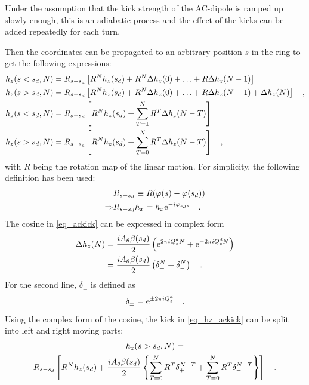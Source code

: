Under the assumption that the kick strength of the AC-dipole is ramped up slowly enough, this is an
adiabatic process and the effect of the kicks can be added repeatedly for each turn.

Then the coordinates can be propagated to an arbitrary position $s$ in the ring to get the following
expressions:
%
\begin{align}
    h_z(s<s_d, N) &= R_{s-s_d}\left[R^N h_z(s_d) + R^N\Delta h_z(0) + \ldots + R\Delta h_z(N-1)\right] \notag\\
    h_z(s>s_d, N) &= R_{s-s_d}\left[R^N h_z(s_d) + R^N\Delta h_z(0) + \ldots + R\Delta h_z(N-1) + \Delta h_z(N)\right] 
    \quad ,\\
    h_z(s<s_d, N) &= R_{s-s_d}\left[R^N h_z(s_d) + \sum\limits_{T=1}^N R^T\Delta h_z(N-T)\right] \notag\\
    h_z(s>s_d, N) &= R_{s-s_d}\left[R^N h_z(s_d) + \sum\limits_{T=0}^N R^T\Delta h_z(N-T)\right]
    \quad ,
    \label{eq_hz_ackick}
\end{align}
%
with $R$ being the rotation map of the linear motion. For simplicity, the following definition has been used:
%
\begin{align}
    &R_{s-s_d} \equiv R(\varphi(s) - \varphi(s_d))\\
    \Rightarrow &R_{s-s_d} h_x = h_x \text{e}^{-i\varphi_{s_d s}}
    \quad .
\end{align}
%
The cosine in \eqref{eq_ackick} can be expressed in complex form
%
\begin{align}
    \Delta h_z(N) &= \frac{iA_\theta\beta(s_d)}{2} \left(
        \text{e}^{2\pi i Q^{d}_{z} N} +
        \text{e}^{-2\pi i Q^{d}_{z} N}
    \right) \notag\\
    &= \frac{iA_\theta\beta(s_d)}{2} \left(
        \delta_+^N + \delta_-^N
    \right)
    \quad .
\end{align}
%
For the second line, $\delta_\pm$ is defined as
%
\begin{equation}
    \delta_\pm = \text{e}^{\pm 2\pi i Q^{d}_{z}}
    \quad .
\end{equation}
%
Using the complex form of the cosine, the kick in \eqref{eq_hz_ackick} can be split into left and right moving parts:
%
\begin{multline}
    h_z(s>s_d, N) = \\
    R_{s-s_d}\left[
        R^N h_z(s_d) +
        \frac{iA_\theta\beta(s_d)}{2}\left\{
            \sum\limits_{T=0}^N R^T \delta_+^{N-T}
            + \sum\limits_{T=0}^N R^T \delta_-^{N-T}
        \right\}
        \right]
    \quad .
\end{multline}
